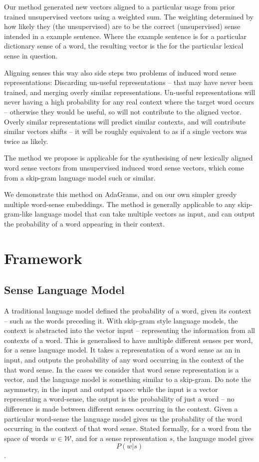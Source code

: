 \documentclass{sig-alternate}
\newcommand{\W}{\mathcal{W}}
\begin{document}
Our method generated new vectors aligned to a particular usage from prior trained unsupervised vectors using a weighted sum. The weighting determined by how likely they (the unsupervised) are to be the correct (unsupervised) sense intended in a example sentence. Where the example sentence is for a particular dictionary sense of a word, the resulting vector is the for the particular lexical sense in question.

Aligning senses this way also side steps two problems of induced word sense representations: Discarding un-useful representations -- that may have never been trained, and merging overly similar representations. Un-useful representations will never having a high probability for any real context where the target word occurs -- otherwise they would be useful, so will not contribute to the aligned vector. Overly similar representations will  predict similar contexts, and will contribute similar vectors shifts -- it will be roughly equivalent to as if a single vectors was twice as likely.


The method we propose is applicable for the synthesising of new lexically aligned word sense vectors from unsupervised induced word sense vectors, which come from a skip-gram language model such or similar.



We demonstrate this method on AdaGrams\parencite{AdaGrams}, and on our own simpler greedy multiple word-sense embeddings. The method is generally applicable to any skip-gram-like language model that can take multiple vectors as input, and can output the probability of a word appearing in their context.

\section{Framework}


\subsection{Sense Language Model}
A traditional language model defined the probability of a word, given its context -- such as the words preceding it.
With skip-gram style language models, the context is abstracted into the vector input -- representing the information from all contexts of a word. This is generalised to have multiple different senses per word, for a sense language model.
It takes a representation of a word sense as an in input, and outputs the probability of any word occurring in the context of the that word sense. In the cases we consider that word sense representation is a vector, and the language model is something similar to a skip-gram. Do note the asymmetry, in the input and output space: while the input is a vector representing a word-sense, the output is the probability of just a word -- no difference is made between different senses occurring in the context. Given a particular word-sense the language model gives us the probability of the word occurring in the context of that word sense. Stated formally, for a word from the space of words $w\in \W$, and for a sense representation $s$, the language model gives $$P(w | s)$$.
\end{document}
